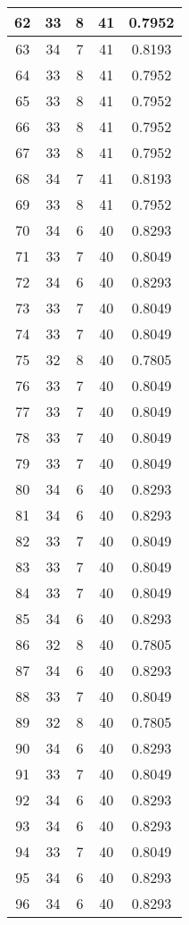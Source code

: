 \documentclass[letterpaper, 12pt]{article}
\begin{document}
\begin{longtable}{|c|c|c|c|c|}
\hline
62 & 33 & 8 & 41 & 0.7952 \\
\hline
63 & 34 & 7 & 41 & 0.8193 \\
\hline
64 & 33 & 8 & 41 & 0.7952 \\
\hline
65 & 33 & 8 & 41 & 0.7952 \\
\hline
66 & 33 & 8 & 41 & 0.7952 \\
\hline
67 & 33 & 8 & 41 & 0.7952 \\
\hline
68 & 34 & 7 & 41 & 0.8193 \\
\hline
69 & 33 & 8 & 41 & 0.7952 \\
\hline
70 & 34 & 6 & 40 & 0.8293 \\
\hline
71 & 33 & 7 & 40 & 0.8049 \\
\hline
72 & 34 & 6 & 40 & 0.8293 \\
\hline
73 & 33 & 7 & 40 & 0.8049 \\
\hline
74 & 33 & 7 & 40 & 0.8049 \\
\hline
75 & 32 & 8 & 40 & 0.7805 \\
\hline
76 & 33 & 7 & 40 & 0.8049 \\
\hline
77 & 33 & 7 & 40 & 0.8049 \\
\hline
78 & 33 & 7 & 40 & 0.8049 \\
\hline
79 & 33 & 7 & 40 & 0.8049 \\
\hline
80 & 34 & 6 & 40 & 0.8293 \\
\hline
81 & 34 & 6 & 40 & 0.8293 \\
\hline
82 & 33 & 7 & 40 & 0.8049 \\
\hline
83 & 33 & 7 & 40 & 0.8049 \\
\hline
84 & 33 & 7 & 40 & 0.8049 \\
\hline
85 & 34 & 6 & 40 & 0.8293 \\
\hline
86 & 32 & 8 & 40 & 0.7805 \\
\hline
87 & 34 & 6 & 40 & 0.8293 \\
\hline
88 & 33 & 7 & 40 & 0.8049 \\
\hline
89 & 32 & 8 & 40 & 0.7805 \\
\hline
90 & 34 & 6 & 40 & 0.8293 \\
\hline
91 & 33 & 7 & 40 & 0.8049 \\
\hline
92 & 34 & 6 & 40 & 0.8293 \\
\hline
93 & 34 & 6 & 40 & 0.8293 \\
\hline
94 & 33 & 7 & 40 & 0.8049 \\
\hline
95 & 34 & 6 & 40 & 0.8293 \\
\hline
96 & 34 & 6 & 40 & 0.8293 \\

\end{longtable}
\end{document}
